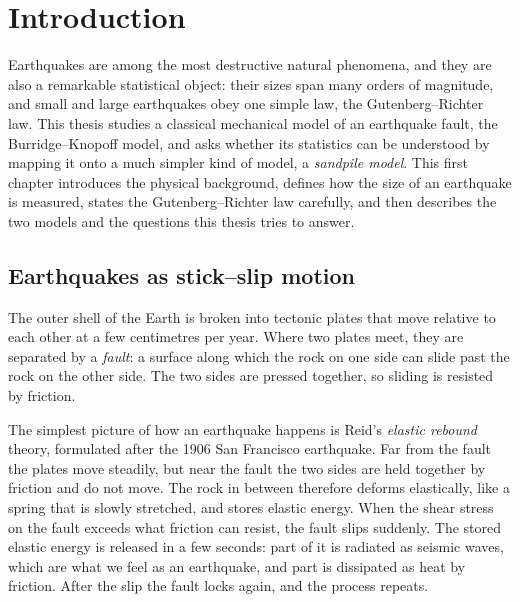 \chapter{Introduction}
\label{ch:intro}

Earthquakes are among the most destructive natural phenomena, and they are also a
remarkable statistical object: their sizes span many orders of magnitude, and small and
large earthquakes obey one simple law, the Gutenberg--Richter law. This thesis studies a
classical mechanical model of an earthquake fault, the Burridge--Knopoff model, and asks
whether its statistics can be understood by mapping it onto a much simpler kind of model,
a \emph{sandpile model}. This first chapter introduces the physical background, defines
how the size of an earthquake is measured, states the Gutenberg--Richter law carefully,
and then describes the two models and the questions this thesis tries to answer.

\section{Earthquakes as stick--slip motion}
\label{sec:stickslip}

The outer shell of the Earth is broken into tectonic plates that move relative to each other
at a few centimetres per year. Where two plates meet, they are separated by a \emph{fault}: a
surface along which the rock on one side can slide past the rock on the other side. The two
sides are pressed together, so sliding is resisted by friction.

The simplest picture of how an earthquake happens is Reid's \emph{elastic rebound} theory,
formulated after the 1906 San Francisco earthquake. Far from the fault the plates move
steadily, but near the fault the two sides are held together by friction and do not move.
The rock in between therefore deforms elastically, like a spring that is slowly stretched,
and stores elastic energy. When the shear stress on the fault exceeds what friction can
resist, the fault slips suddenly. The stored elastic energy is released in a few seconds:
part of it is radiated as seismic waves, which are what we feel as an earthquake, and part is
dissipated as heat by friction. After the slip the fault locks again, and the process
repeats.

